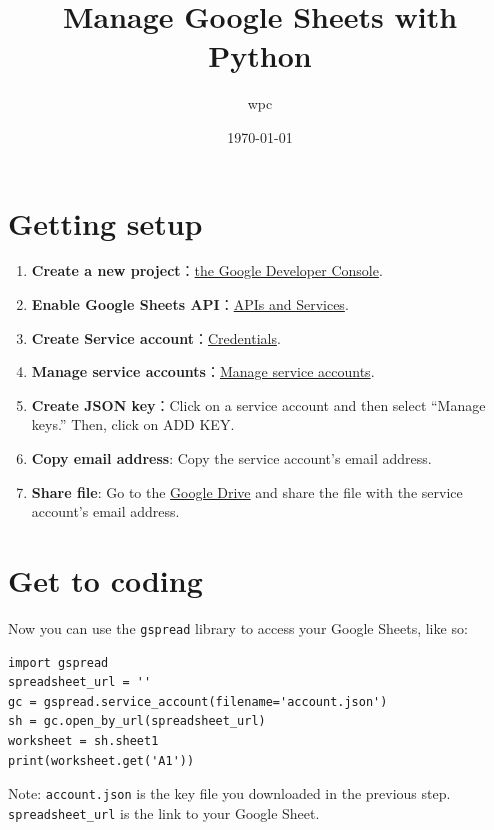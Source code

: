 \documentclass[UTF8]{ctexart}
\title{Manage Google Sheets with Python}
\author{wpc}
\date{\today}
\begin{document}
\maketitle

\section{Getting setup}
\begin{enumerate}
	\item \textbf{Create a new project}：\href{https://console.developers.google.com/}{the Google Developer Console}.
	\item \textbf{Enable Google Sheets API}：\href{https://console.cloud.google.com/apis}{APIs and Services}.
	\item \textbf{Create Service account}：\href{https://console.cloud.google.com/apis/credentials}{Credentials}.
	\item \textbf{Manage service accounts}：\href{https://console.cloud.google.com/iam-admin/serviceaccounts}{Manage service accounts}.
	\item \textbf{Create JSON key}：Click on a service account and then select “Manage keys.” Then, click on ADD KEY.
	\item \textbf{Copy email address}: Copy the service account's email address.
	\item \textbf{Share file}: Go to the \href{https://drive.google.com/drive/home}{Google Drive} and share the file with the service account's email address.
\end{enumerate}

\section{Get to coding}
Now you can use the \texttt{gspread} library to access your Google Sheets, like so:

\begin{lstlisting}
import gspread
spreadsheet_url = ''
gc = gspread.service_account(filename='account.json')
sh = gc.open_by_url(spreadsheet_url)
worksheet = sh.sheet1
print(worksheet.get('A1'))
\end{lstlisting}

Note: \texttt{account.json} is the key file you downloaded in the previous step.
\texttt{spreadsheet\_url} is the link to your Google Sheet.
\end{document}

